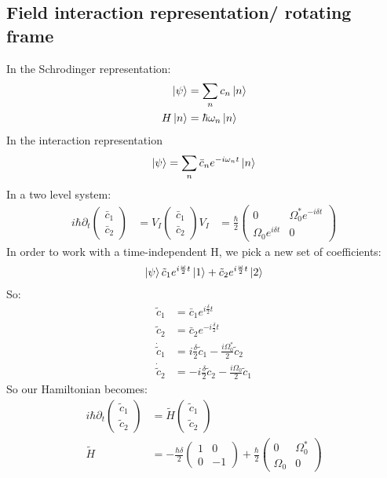 \subsection{Field interaction representation/ rotating frame}
In the Schrodinger representation:
\begin{align*}
	\ket{\psi} &= \sum_n c_n \ket{n} \\
	H\ket{n} &= \hbar\omega_n\ket{n}
\end{align*}
In the interaction representation
\begin{align*}
	\ket{\psi} &= \sum_n \bar{c}_n e^{-i\omega_n t}\ket{n} \\
\end{align*}
In a two level system:
\begin{align*}
	i\hbar\partial_t \begin{pmatrix}
		\bar{c}_1 \\
		\bar{c}_2 
	\end{pmatrix} &= V_I \begin{pmatrix}
	\bar{c}_1 \\
	\bar{c}_2
		      \end{pmatrix}
	V_I &= \frac{\hbar}{2} \begin{pmatrix}
		0 & \Omega_0^* e^{-i\delta t} \\
		\Omega_0 e^{i\delta t} & 0
			\end{pmatrix}
\end{align*}
In order to work with a time-independent H, we pick a new set of coefficients:
\begin{align*}
	\ket{\psi} \tilde{c}_1 e^{i\frac{\omega}{2} t} \ket{1} + \tilde{c}_2 e^{i\frac{\omega}{2} t}\ket{2}
\end{align*}
So:
\begin{align*}
	\tilde{c}_1 &= \bar{c}_1 e^{i\frac{\delta}{2} t} \\
	\tilde{c}_2 &= \bar{c}_2 e^{-i\frac{\delta}{2} t} \\
	\dot{\tilde{c}}_1 &= i\frac{\delta}{2} \tilde{c}_1 -\frac{i\Omega_0^*}{2} \tilde{c}_2 \\
	\dot{\tilde{c}}_2 &= -i\frac{\delta}{2} \tilde{c}_2 -\frac{i\Omega_0}{2} \tilde{c}_1
\end{align*}
So our Hamiltonian becomes:
\begin{align*}
	i\hbar \partial_t \begin{pmatrix}
		\tilde{c}_1 \\
		\tilde{c}_2 
	\end{pmatrix} &= \tilde{H} \begin{pmatrix}
\tilde{c}_1 \\
\tilde{c}_2
			    \end{pmatrix} \\
	\tilde{H} &= -\frac{\hbar\delta}{2} \begin{pmatrix}
		1 & 0 \\
		0 & -1
	\end{pmatrix} + \frac{\hbar}{2} \begin{pmatrix}
		0 & \Omega_0^* \\
		\Omega_0 & 0
				 \end{pmatrix}
\end{align*}
